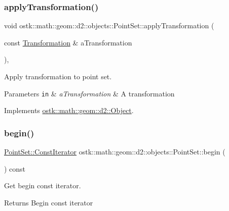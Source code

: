 \subsubsection{\texorpdfstring{apply\+Transformation()}{applyTransformation()}}
{\footnotesize\ttfamily void ostk\+::math\+::geom\+::d2\+::objects\+::\+Point\+Set\+::apply\+Transformation (\begin{DoxyParamCaption}\item[{const \hyperlink{classostk_1_1math_1_1geom_1_1d2_1_1_transformation}{Transformation} \&}]{a\+Transformation }\end{DoxyParamCaption})\hspace{0.3cm}{\ttfamily [override]}, {\ttfamily [virtual]}}



Apply transformation to point set. 


\begin{DoxyParams}[1]{Parameters}
\mbox{\tt in}  & {\em a\+Transformation} & A transformation \\
\hline
\end{DoxyParams}


Implements \hyperlink{classostk_1_1math_1_1geom_1_1d2_1_1_object_a959e50211d7a680f7f904bbb752d75c9}{ostk\+::math\+::geom\+::d2\+::\+Object}.

\mbox{\label{classostk_1_1math_1_1geom_1_1d2_1_1objects_1_1_point_set_aaa290d13737a148694f97fc557e2069a}} 
\subsubsection{\texorpdfstring{begin()}{begin()}}
{\footnotesize\ttfamily \hyperlink{classostk_1_1math_1_1geom_1_1d2_1_1objects_1_1_point_set_a6a0613cc686e9247430658eee91036d0}{Point\+Set\+::\+Const\+Iterator} ostk\+::math\+::geom\+::d2\+::objects\+::\+Point\+Set\+::begin (\begin{DoxyParamCaption}{ }\end{DoxyParamCaption}) const}



Get begin const iterator. 

\begin{DoxyReturn}{Returns}
Begin const iterator 
\end{DoxyReturn}
\mbox{\label{classostk_1_1math_1_1geom_1_1d2_1_1objects_1_1_point_set_ac1d1c3727df0f10f527aa3d3551c8f4e}} 
